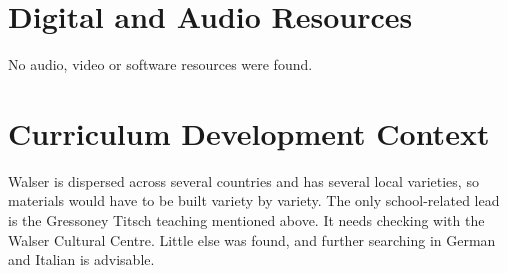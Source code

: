 \documentclass[12pt]{article}
\begin{document}
\section{Digital and Audio Resources}
No audio, video or software resources were found.

\section{Curriculum Development Context}
Walser is dispersed across several countries and has several local varieties, so materials would have to be built variety by variety. The only school-related lead is the Gressoney Titsch teaching mentioned above. It needs checking with the Walser Cultural Centre. Little else was found, and further searching in German and Italian is advisable.
\end{document}
